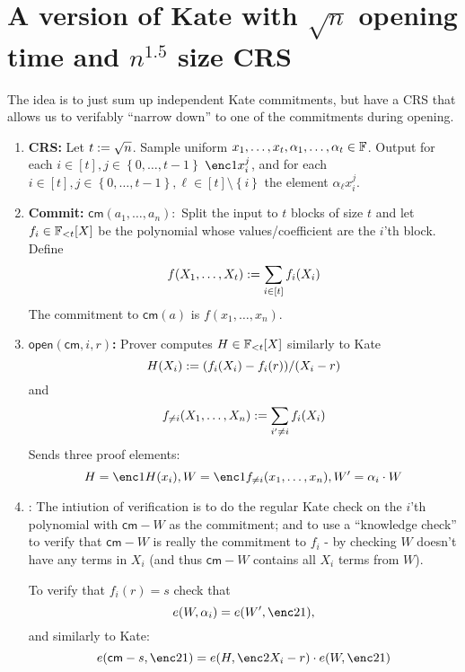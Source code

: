 \documentclass[11pt]{article}
\numberwithin{figure}{section} %
\newcommand{\cm}{\ensuremath{\mathsf{cm}}\xspace}
\newcommand{\open}{\ensuremath{\mathsf{open}}\xspace}
\newcommand{\set}[1]{\ensuremath{\left\{#1\right\}}\xspace}
\begin{document}
 \section{A version of Kate with $\sqrt{n}$ opening time and $n^{1.5}$ size CRS}
 The idea is to just sum up independent Kate commitments, but have a CRS that allows us to verifably ``narrow down'' to one of the commitments during opening.
 \begin{enumerate}
  \item \textbf{CRS:} Let $t:= \sqrt n$. Sample uniform $x_1,\ldots,x_t,\alpha_1,\ldots,\alpha_t\in {\mathbb F}$. Output for each  $i\in [t], j\in \set{0,\ldots, t-1}$ $\enc1{x_i^j}$, and for each $i\in [t],  j\in \set{0,\ldots, t-1},\ell \in [t]\setminus\set{i}$ the element $\alpha_\ell x_i^j$.
  \item \textbf{Commit:} $\cm(a_1,\ldots,a_n):$ Split the input to $t$ blocks of size $t$ and let $f_i\in{\mathbb F}_{< t}[X]$ be the polynomial whose values/coefficient are the $i$'th block.
  Define
  \[f(X_1,\ldots,X_t):= \sum_{i\in [t]} f_i(X_i)  \]
  The commitment  to $\cm(a)$ is $f(x_1,\ldots,x_n)$.
  \item \textbf{$\open(\cm,i,r)$:}  Prover computes $H\in {\mathbb F}_{< t}[X]$ similarly to Kate
  \[H(X_i):= (f_i(X_i)-f_i(r))/(X_i-r)\]
  and 
  \[f_{\neq i}(X_1,\ldots,X_n):=\sum_{i'\neq i} f_i(X_i)\]
  Sends three proof elements:
  \[H=\enc1{H(x_i)},W=\enc1{f_{\neq i}(x_1,\ldots,x_n)}, W'=\alpha_i\cdot W\] 
  \item \verify{\cm,H,W,W',i,r,s}: The intiution of verification is to do the regular Kate check on the $i$'th polynomial with $\cm-W$ as the commitment; and to use a ``knowledge check'' to verify that $\cm-W$ is really the commitment to $f_i$ - by checking $W$ doesn't have any terms in $X_i$ (and thus $\cm-W$ contains all $X_i$ terms from $W$).
  
  To verify that $f_i(r)=s$  check that
  \[e(W,\alpha_i)= e(W',\enc2{1}),  \]
  and similarly to Kate:
  \[e(\cm - s,\enc2{1})=e(H,\enc2{X_i-r})\cdot e(W,\enc2{1})\]
  \end{enumerate}
\end{document}
